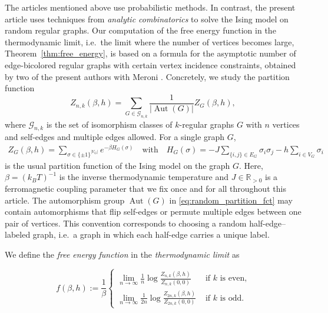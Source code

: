\documentclass{article}
\numberwithin{theorem}{section}
\theoremstyle{remark}
\newcommand{\RR}{\mathbb{R}}
\DeclareMathOperator{\Aut}{Aut}
\newcommand{\GG}{\mathcal{G}}
\begin{document}
The articles mentioned above use probabilistic methods. In contrast, the present article uses techniques from \emph{analytic combinatorics} to solve the Ising model on random regular graphs. 
Our computation of the free energy function in the thermodynamic limit, i.e.\ the limit where the number of vertices becomes large, Theorem~\ref{thm:free_energy}, is based on a formula for the asymptotic number of edge-bicolored regular graphs with certain vertex incidence constraints, obtained by two of the present authors with Meroni \cite{BMW_bicolored,BMW_multicolor}. Concretely, we study the partition function
\begin{equation}
  \label{eq:random_partition_fct}
  Z_{n,k}(\beta, h) = \sum_{G \in \GG_{n,k}} \frac{1}{|\Aut(G)|} Z_G(\beta,h),
\end{equation}
where $\GG_{n,k}$ is the set of isomorphism classes of $k$-regular graphs $G$ with $n$ vertices and self-edges and multiple edges allowed. For a single graph $G$, 
\begin{align}
\label{eq:ZG}
  Z_G(\beta,h) = \sum_{\sigma\in \{\pm 1\}^{|V_G|}} e^{-\beta H_G(\sigma)} \quad \text{with} \quad H_G(\sigma) = -J\!\!\! \sum_{\{i,j\}\in E_G} \sigma_i\sigma_j - h \sum_{i \in V_G} \sigma_i
\end{align}
is the usual partition function of the Ising model on the graph $G$. Here, $\beta = (k_B T)^{-1}$ is the inverse thermodynamic temperature and $J \in \RR_{> 0}$ is a ferromagnetic coupling parameter that we fix once and for all throughout this article.
The automorphism group $\Aut(G)$ in \eqref{eq:random_partition_fct} may contain automorphisms that flip self-edges or permute multiple edges between one pair of vertices. 
This convention corresponds to choosing a random half-edge--labeled graph, i.e.~a graph in which each half-edge carries a unique label.\par

We define the \emph{free energy function} in the \emph{thermodynamic limit} as 

\begin{equation} 
  \label{eq:def_free_energy}
  f(\beta,h) := \frac{1}{\beta}
  \begin{cases}
    \lim_{n\to\infty} \frac{1}{n} \log \frac{Z_{n,k}(\beta, h)}{Z_{n,k}(0, 0)} & \text{ if $k$ is even,} \\
    \lim_{n\to\infty} \frac{1}{2n} \log \frac{Z_{2n,k}(\beta, h)}{Z_{2n,k}(0, 0)} & \text{ if $k$ is odd. }
  \end{cases}
\end{equation}
\end{document}

